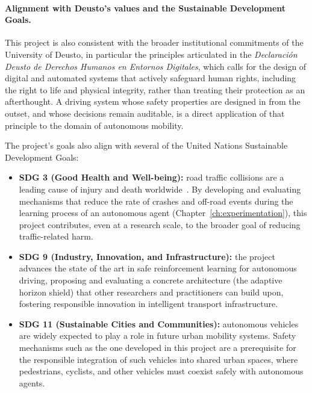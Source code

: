 \paragraph{Alignment with Deusto's values and the Sustainable Development Goals.}
This project is also consistent with the broader institutional commitments of the
University of Deusto, in particular the principles articulated in the
\textit{Declaración Deusto de Derechos Humanos en Entornos Digitales}, which calls for
the design of digital and automated systems that actively safeguard human rights,
including the right to life and physical integrity, rather than treating their
protection as an afterthought. A driving system whose safety properties are designed in
from the outset, and whose decisions remain auditable, is a direct application of that
principle to the domain of autonomous mobility.

The project's goals also align with several of the United Nations Sustainable
Development Goals:

\begin{itemize}
  \item \textbf{SDG 3 (Good Health and Well-being):} road traffic collisions are a
        leading cause of injury and death worldwide~\cite{who2023road}. By developing and evaluating
        mechanisms that reduce the rate of crashes and off-road events during the
        learning process of an autonomous agent (Chapter~\ref{ch:experimentation}), this
        project contributes, even at a research scale, to the broader goal of reducing
        traffic-related harm.

  \item \textbf{SDG 9 (Industry, Innovation, and Infrastructure):} the project advances
        the state of the art in safe reinforcement learning for autonomous driving,
        proposing and evaluating a concrete architecture (the adaptive horizon shield)
        that other researchers and practitioners can build upon, fostering responsible
        innovation in intelligent transport infrastructure.

  \item \textbf{SDG 11 (Sustainable Cities and Communities):} autonomous vehicles are
        widely expected to play a role in future urban mobility systems. Safety
        mechanisms such as the one developed in this project are a prerequisite for the
        responsible integration of such vehicles into shared urban spaces, where
        pedestrians, cyclists, and other vehicles must coexist safely with autonomous
        agents.
\end{itemize}

